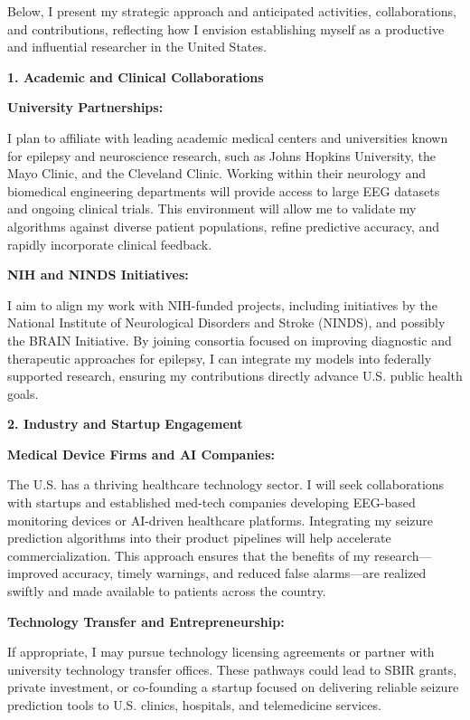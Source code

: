 \documentclass{article}
\begin{document}
Below, I present my strategic approach and anticipated activities, collaborations, and contributions, reflecting how I envision establishing myself as a productive and influential researcher in the United States.


{\bf 1. Academic and Clinical Collaborations }

{\bf University Partnerships: }

I plan to affiliate with leading academic medical centers and universities known for epilepsy and neuroscience research, such as Johns Hopkins University, the Mayo Clinic, and the Cleveland Clinic. Working within their neurology and biomedical engineering departments will provide access to large EEG datasets and ongoing clinical trials. This environment will allow me to validate my algorithms against diverse patient populations, refine predictive accuracy, and rapidly incorporate clinical feedback.

{\bf NIH and NINDS Initiatives: }

I aim to align my work with NIH-funded projects, including initiatives by the National Institute of Neurological Disorders and Stroke (NINDS), and possibly the BRAIN Initiative. By joining consortia focused on improving diagnostic and therapeutic approaches for epilepsy, I can integrate my models into federally supported research, ensuring my contributions directly advance U.S. public health goals.

{\bf 2. Industry and Startup Engagement }

{\bf Medical Device Firms and AI Companies: }

The U.S. has a thriving healthcare technology sector. I will seek collaborations with startups and established med-tech companies developing EEG-based monitoring devices or AI-driven healthcare platforms. Integrating my seizure prediction algorithms into their product pipelines will help accelerate commercialization. This approach ensures that the benefits of my research—improved accuracy, timely warnings, and reduced false alarms—are realized swiftly and made available to patients across the country.

{\bf Technology Transfer and Entrepreneurship: } 

If appropriate, I may pursue technology licensing agreements or partner with university technology transfer offices. These pathways could lead to SBIR grants, private investment, or co-founding a startup focused on delivering reliable seizure prediction tools to U.S. clinics, hospitals, and telemedicine services.
\end{document}
